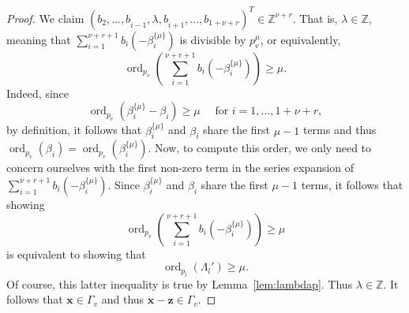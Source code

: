 \documentclass[11pt]{report}
\theoremstyle{definition}
\DeclareMathOperator{\ord}{ord}
\begin{document}
\begin{proof}
  We claim $(b_2, \dots, b_{\hat{i} - 1}, \lambda, b_{\hat{i}+1}, \dots, b_{1+\nu+r})^T \in \mathbb{Z}^{\nu + r}$. That is, $\lambda \in \mathbb{Z}$, meaning that $\sum_{i = 1}^{\nu + r + 1}b_i(-\beta_i^{\{\mu\}})$ is divisible by $p_v^{\mu}$, or equivalently,
  \[\ord_{p_v}\left(\sum_{i = 1}^{\nu + r + 1}b_i(-\beta_i^{\{\mu\}})\right) \geq \mu.\]
  Indeed, since
  \[\ord_{p_{v}}\left(\beta_{i}^{\{\mu\}}-\beta_{i}\right) \geq \mu \quad \text { for } i=1, \dots, 1+\nu+r,\]
  by definition, it follows that $\beta_{i}^{\{\mu\}}$ and $\beta_{i}$ share the first $\mu - 1$ terms and thus $\ord_{p_v}(\beta_i) = \ord_{p_v}(\beta_i^{\{\mu\}})$.
  Now, to compute this order, we only need to concern ourselves with the first non-zero term in the series expansion of $\sum_{i = 1}^{\nu + r + 1}b_i(-\beta_i^{\{\mu\}})$. Since $\beta_{i}^{\{\mu\}}$ and $\beta_{i}$ share the first $\mu - 1$ terms, it follows that showing
  \[\ord_{p_v}\left(\sum_{i = 1}^{\nu + r + 1}b_i(-\beta_i^{\{\mu\}})\right) \geq \mu\]
  is equivalent to showing that
  \[\ord_{p_l}(\Lambda_l') \geq \mu.\]
  Of course, this latter inequality is true by Lemma~\ref{lem:lambdap}. Thus $\lambda \in \mathbb{Z}$. It follows that $\mathbf{x} \in \Gamma_v$ and thus $\mathbf{x} - \mathbf{z} \in \Gamma_v$.


\end{proof}
\end{document}
